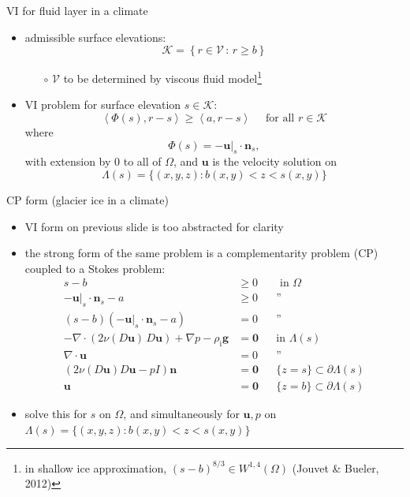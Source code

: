 \documentclass[svgnames,
               hyperref={colorlinks,citecolor=DeepPink4,linkcolor=FireBrick,urlcolor=Maroon},
               usepdftitle=false]  %
               {beamer}
\newcommand{\bn}{\mathbf{n}}
\newcommand{\bu}{\mathbf{u}}
\newcommand{\bzero}{\bm{0}}
\newcommand{\rhoi}{\rho_{\text{i}}}
\newcommand{\ip}[2]{\left<#1,#2\right>}
\begin{document}
\begin{frame}{VI for fluid layer in a climate}

\begin{itemize}
\item admissible surface elevations:
    $$\mathcal{K} = \left\{r \in \mathcal{V} \,:\, r \ge b\right\}$$

    \begin{itemize}
    \item[$\circ$] $\mathcal{V}$ to be determined by viscous fluid model\footnote{in shallow ice approximation, $(s-b)^{8/3} \in W^{1,4}(\Omega)$ (Jouvet \& Bueler, 2012)}
    \end{itemize}
\item VI problem for surface elevation $s\in\mathcal{K}$:
	$$\ip{\Phi(s)}{r-s} \ge \ip{a}{r-s} \quad \text{ for all } r \in \mathcal{K}$$
where
    $$\Phi(s)=- \bu|_s \cdot \bn_s,$$
with extension by 0 to all of $\Omega$, and $\bu$ is the velocity solution on
    $$\Lambda(s) = \{(x,y,z) : b(x,y) < z < s(x,y)\}$$
\end{itemize}
\end{frame}


\begin{frame}{CP form (glacier ice in a climate)}

\begin{itemize}
\item VI form on previous slide is too abstracted for clarity
\item the strong form of the same problem is a \alert{complementarity problem (CP) coupled to a Stokes problem}:
\begin{align*}
s - b &\ge 0 && \text{ in $\Omega$} \\
- \bu|_s \cdot \bn_s - a &\ge 0 && \text{''} \\
(s-b)(- \bu|_s \cdot \bn_s - a) &= 0 && \text{''} \\
- \nabla \cdot \left(2 \nu(D\bu)\, D\bu\right) + \nabla p - \rhoi \mathbf{g} &= \bzero && \text{in $\Lambda(s)$} \\
\nabla \cdot \bu &= 0 && \text{''} \\
\left(2 \nu(D\bu) D\bu - pI\right) \bn &= \bzero && \{z=s\} \subset \partial \Lambda(s) \\
\bu &= \bzero && \{z=b\} \subset \partial \Lambda(s)
\end{align*}
\item solve this for $s$ on $\Omega$, and simultaneously for $\bu,p$ on $\Lambda(s) = \{(x,y,z) : b(x,y) < z < s(x,y)\}$
\end{itemize}
\end{frame}
\end{document}
